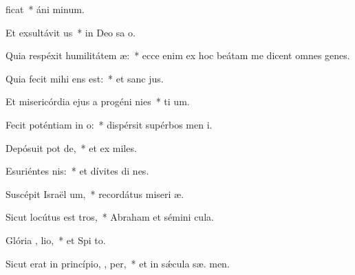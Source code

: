 \item {}ficat~* áni  minum.
\item Et exsultávit  us~* in Deo sa o.
\item Quia respéxit humilitátem  æ:~* ecce enim ex hoc beátam me dicent omnes genes.
\item Quia fecit mihi   ens est:~* et sanc  jus.
\item Et misericórdia ejus a progéni  nies~* ti um.
\item Fecit poténtiam in  o:~* dispérsit supérbos men  i.
\item Depósuit pot  de,~* et ex miles.
\item Esuriéntes  nis:~* et dívites di nes.
\item Suscépit Israël  um,~* recordátus miseri æ.
\item Sicut locútus est   tros,~* Abraham et sémini   cula.
\item Glória ,  lio,~* et Spi to.
\item Sicut erat in princípio,  ,  per,~* et in sǽcula sæ. men.
